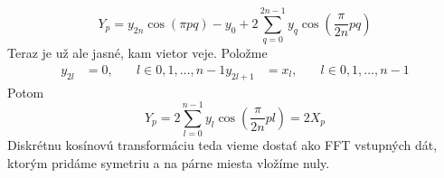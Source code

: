 \begin{equation}
    Y_p =  y_{2n} \cos( \pi pq) - y_0 + 2 \sum_{q=0}^{2n-1} y_q 
                \cos ( \frac{\pi}{2 n} p q )
\end{equation}
Teraz je už ale jasné, kam vietor veje. Položme
\begin{align}
    y_{2l} &= 0, \quad & l\in 0,1, \dots, n-1
    y_{2l+1} &= x_l, \quad & l \in 0,1, \dots, n-1
\end{align}
Potom
\begin{equation}
    Y_p = 2 \sum_{l=0}^{n-1} y_l 
                \cos ( \frac{\pi}{2 n} p l ) = 2 X_p
\end{equation}
Diskrétnu kosínovú transformáciu teda vieme dostať ako
FFT vstupných dát, ktorým pridáme symetriu a na párne miesta vložíme
nuly.



